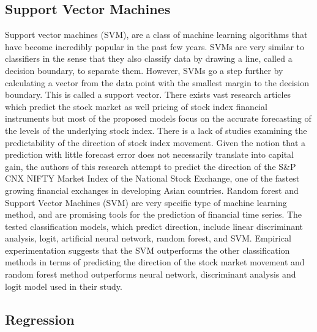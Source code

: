 \subsection{Support Vector Machines}

Support vector machines (SVM), are a class of machine learning algorithms that have become incredibly popular in the past few years. SVMs are very similar to classifiers in the sense that they also classify data by drawing a line, called a decision boundary, to separate them. However, SVMs go a step further by calculating a vector from the data point with the smallest margin to the decision boundary. This is called a support vector. There exists vast research articles which predict the stock market as well pricing of stock index financial instruments but most of the proposed models focus on the accurate forecasting of the levels of the underlying stock index. There is a lack of studies examining the predictability of the direction of stock index movement. Given the notion that a prediction with little forecast error does not necessarily translate into capital gain, the authors of this research attempt to predict the direction of the S\&P CNX NIFTY Market Index of the National Stock Exchange, one of the fastest growing financial exchanges in developing Asian countries.\cite{Kumar:2016aa} Random forest and Support Vector Machines (SVM) are very specific type of machine learning method, and are promising tools for the prediction of financial time series. The tested classification models, which predict direction, include linear discriminant analysis, logit, artificial neural network, random forest, and SVM. Empirical experimentation suggests that the SVM outperforms the other classification methods in terms of predicting the direction of the stock market movement and random forest method outperforms neural network, discriminant analysis and logit model used in their study.

\subsection{Regression}


